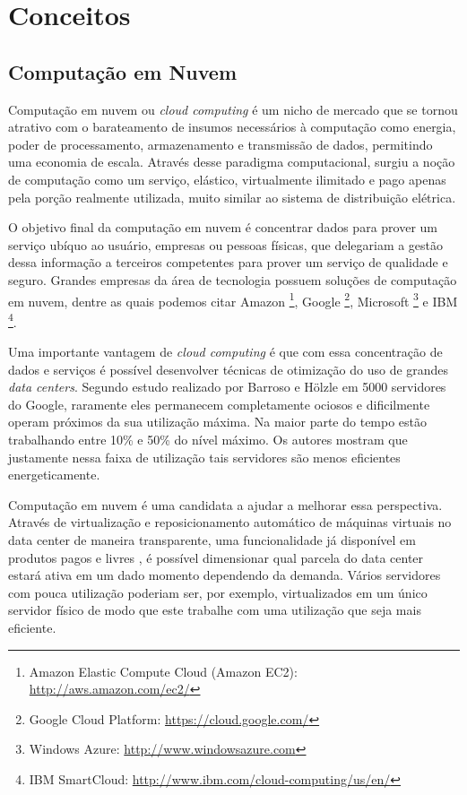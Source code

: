 \chapter{Conceitos}
\label{cap:conceitos}

\section{Computação em Nuvem}
\label{sec:computacao_nuvem}
Computação em nuvem ou \emph{cloud computing} é um nicho de mercado que se tornou atrativo com o
barateamento de insumos necessários à computação como energia, poder de 
processamento, armazenamento e transmissão de dados, permitindo uma economia
de escala. \cite{eecs:above-clouds} Através desse paradigma computacional, 
surgiu a noção de computação como um serviço, elástico, virtualmente ilimitado e
pago apenas pela porção realmente utilizada, muito similar ao sistema de
distribuição elétrica.

O objetivo final da computação em nuvem é concentrar dados para prover um 
serviço ubíquo ao usuário, empresas ou pessoas físicas, que delegariam a gestão
dessa informação a terceiros competentes para prover um serviço de qualidade e 
seguro. Grandes empresas da área de tecnologia possuem soluções de computação em
nuvem, dentre as quais podemos citar Amazon \footnote{Amazon Elastic Compute
Cloud (Amazon EC2): \url{http://aws.amazon.com/ec2/}}, Google \footnote{Google
Cloud Platform: \url{https://cloud.google.com/}}, Microsoft \footnote{Windows
Azure: \url{http://www.windowsazure.com}} e IBM \footnote{IBM SmartCloud: 
\url{http://www.ibm.com/cloud-computing/us/en/}}.
 
Uma importante vantagem de \emph{cloud computing} é que com essa concentração de 
dados e serviços é possível desenvolver técnicas de otimização do uso de grandes
\emph{data centers}. Segundo estudo realizado por Barroso e Hölzle
\cite{barroso:case_energy_proportional} em 5000 servidores do Google, raramente
eles permanecem completamente ociosos e dificilmente operam próximos da sua
utilização máxima. Na maior parte do tempo estão trabalhando entre 10\% e 50\% 
do nível máximo. Os autores mostram que justamente nessa faixa de utilização
tais servidores são menos eficientes energeticamente.

Computação em nuvem é uma
candidata a ajudar a melhorar essa perspectiva. Através de virtualização e
reposicionamento automático de máquinas virtuais no data center de maneira
transparente, uma funcionalidade já disponível em produtos pagos
\cite{vmware:vmotion} e livres \cite{clark:live_migration}, é possível dimensionar
qual parcela do data center estará ativa em um dado momento dependendo da
demanda. Vários servidores com pouca utilização poderiam ser, por exemplo,
virtualizados em um único servidor físico de modo que este trabalhe com uma
utilização que seja mais eficiente.

